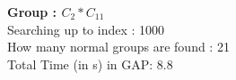 \textbf{Group : $C_2*C_{11}$}\\
Searching up to index : 1000\\
How many normal groups are found : 21\\
Total Time (in s) in GAP: 8.8\\

